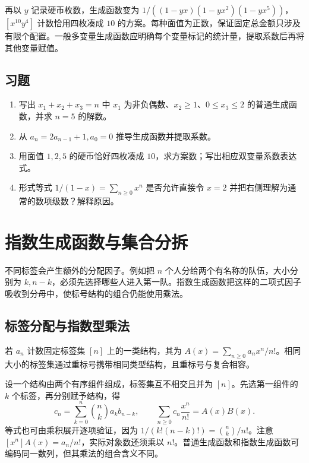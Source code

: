 \documentclass[UTF8,12pt,a4paper,fontset=fandol]{ctexbook}
\begin{document}
再以 $y$ 记录硬币枚数，生成函数变为 $1/((1-yx)(1-yx^2)(1-yx^5))$，$[x^{10}y^4]$ 计数恰用四枚凑成 $10$ 的方案。每种面值为正数，保证固定总金额只涉及有限个配置。一般多变量生成函数应明确每个变量标记的统计量，提取系数后再将其他变量赋值。

\section{习题}
\begin{enumerate}
  \item\label{ex:ogf-1} 写出 $x_1+x_2+x_3=n$ 中 $x_1$ 为非负偶数、$x_2\ge1$、$0\le x_3\le2$ 的普通生成函数，并求 $n=5$ 的解数。
  \item\label{ex:ogf-2} 从 $a_n=2a_{n-1}+1,a_0=0$ 推导生成函数并提取系数。
  \item\label{ex:ogf-3} 用面值 $1,2,5$ 的硬币恰好四枚凑成 $10$，求方案数；写出相应双变量系数表达式。
  \item\label{ex:ogf-4} 形式等式 $1/(1-x)=\sum_{n\ge0}x^n$ 是否允许直接令 $x=2$ 并把右侧理解为通常的数项级数？解释原因。
\end{enumerate}

\chapter{指数生成函数与集合分拆}
\label{ch:egf}

不同标签会产生额外的分配因子。例如把 $n$ 个人分给两个有名称的队伍，大小分别为 $k,n-k$，必须先选择哪些人进入第一队。指数生成函数把这样的二项式因子吸收到分母中，使标号结构的组合仍能使用乘法。

\section{标签分配与指数型乘法}

\begin{definition}
若 $a_n$ 计数固定标签集 $[n]$ 上的一类结构，其为 $A(x)=\sum_{n\ge0}a_nx^n/n!$。相同大小的标签集通过重标号携带相同类型结构，且重标号与复合相容。
\end{definition}

设一个结构由两个有序组件组成，标签集互不相交且并为 $[n]$。先选第一组件的 $k$ 个标签，再分别赋予结构，得
\begin{equation}
 c_n=\sum_{k=0}^n\binom nk a_kb_{n-k},\qquad
 \sum_{n\ge0}c_n\frac{x^n}{n!}=A(x)B(x).
 \label{eq:egf-product}
\end{equation}
等式也可由乘积展开逐项验证，因为 $1/(k!(n-k)!)=\binom nk/n!$。注意 $[x^n]A(x)=a_n/n!$，实际对象数还须乘以 $n!$。普通生成函数和指数生成函数可编码同一数列，但其乘法的组合含义不同。
\end{document}
